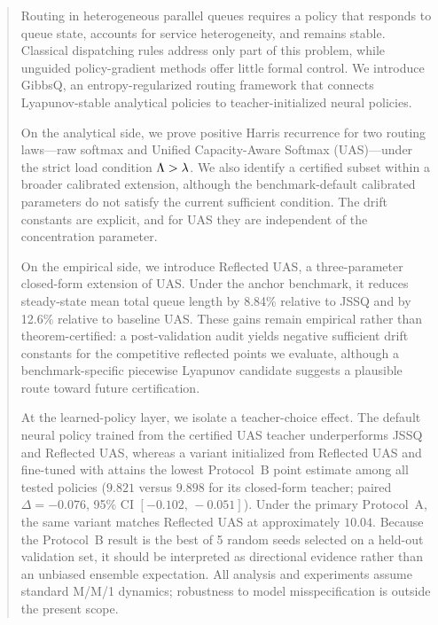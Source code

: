 
\begin{abstract}
Routing in heterogeneous parallel queues requires a policy that responds to queue state, accounts for service heterogeneity, and remains stable. Classical dispatching rules address only part of this problem, while unguided policy-gradient methods offer little formal control. We introduce GibbsQ, an entropy-regularized routing framework that connects Lyapunov-stable analytical policies to teacher-initialized neural policies.

On the analytical side, we prove positive Harris recurrence for two routing laws---raw softmax and Unified Capacity-Aware Softmax (UAS)---under the strict load condition $\totcap > \arrate$. We also identify a certified subset within a broader calibrated extension, although the benchmark-default calibrated parameters do not satisfy the current sufficient condition. The drift constants are explicit, and for UAS they are independent of the concentration parameter.

On the empirical side, we introduce Reflected UAS, a three-parameter closed-form extension of UAS. Under the anchor benchmark, it reduces steady-state mean total queue length by 8.84\% relative to JSSQ and by 12.6\% relative to baseline UAS. These gains remain empirical rather than theorem-certified: a post-validation audit yields negative sufficient drift constants for the competitive reflected points we evaluate, although a benchmark-specific piecewise Lyapunov candidate suggests a plausible route toward future certification.

At the learned-policy layer, we isolate a teacher-choice effect. The default neural policy trained from the certified UAS teacher underperforms JSSQ and Reflected UAS, whereas a variant initialized from Reflected UAS and fine-tuned with \reinforce{} attains the lowest Protocol~B point estimate among all tested policies ($9.821$ versus $9.898$ for its closed-form teacher; paired $\Delta=-0.076$, 95\% CI $[-0.102,\,-0.051]$). Under the primary Protocol~A, the same variant matches Reflected UAS at approximately $10.04$. Because the Protocol~B result is the best of 5 random seeds selected on a held-out validation set, it should be interpreted as directional evidence rather than an unbiased ensemble expectation. All analysis and experiments assume standard M/M/1 dynamics; robustness to model misspecification is outside the present scope.
\end{abstract}
